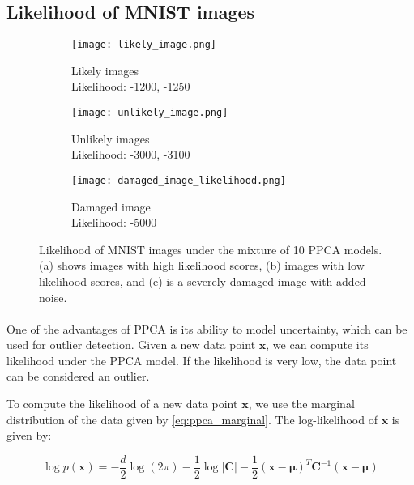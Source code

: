 \documentclass{article}
\begin{document}
\subsection{Likelihood of MNIST images}

\begin{figure}[H]
    \centering
    \begin{subfigure}[b]{0.1\textwidth}
        \centering
        \texttt{[image: likely\_image.png]}
        \caption{Likely images \\ Likelihood: -1200, -1250}
        \label{fig:likely_image_1}
    \end{subfigure}
    \hfill
    \begin{subfigure}[b]{0.1\textwidth}
        \centering
        \texttt{[image: unlikely\_image.png]}
        \caption{Unlikely images \\ Likelihood: -3000, -3100}
        \label{fig:unlikely_image_1}
    \end{subfigure}
    \hfill
    \begin{subfigure}[b]{0.1\textwidth}
        \centering
        \texttt{[image: damaged\_image\_likelihood.png]}
        \caption{Damaged image \\ Likelihood: -5000}
        \label{fig:damaged_image_likelihood}
    \end{subfigure}
    \caption{Likelihood of MNIST images under the mixture of 10 PPCA models. (a) shows images with high likelihood scores, (b) images with low likelihood scores, and (e) is a severely damaged image with added noise.}
    \label{fig:mnist_likelihood}
\end{figure}

\paragraph{} One of the advantages of PPCA is its ability to model uncertainty, which can be used for outlier detection. Given a new data point $\mathbf{x}$, we can compute its likelihood under the PPCA model. If the likelihood is very low, the data point can be considered an outlier.

To compute the likelihood of a new data point $\mathbf{x}$, we use the marginal distribution of the data given by \cref{eq:ppca_marginal}. The log-likelihood of $\mathbf{x}$ is given by:

\begin{equation}
    \label{eq:ppca_log_likelihood}
    \log p(\mathbf{x}) = -\frac{d}{2} \log(2\pi) - \frac{1}{2} \log |\mathbf{C}| - \frac{1}{2} (\mathbf{x} - \boldsymbol{\mu})^T \mathbf{C}^{-1} (\mathbf{x} - \boldsymbol{\mu})
\end{equation}
\end{document}

